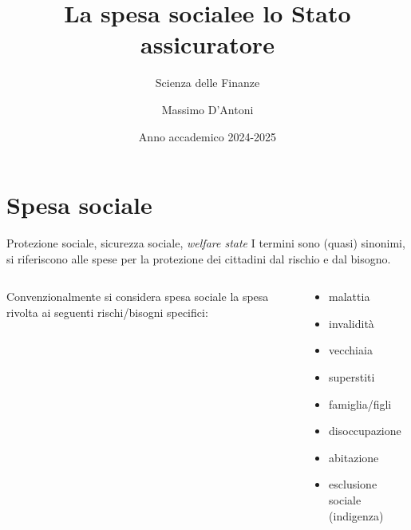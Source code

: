 \documentclass[aspectratio=64,12pt]{beamer}
\institute{Università di Siena}
\author{Massimo D'Antoni}
\date{Anno accademico 2024-2025}
\title{La spesa sociale\newline e lo Stato assicuratore}
\subtitle{Scienza delle Finanze}
\begin{document}
\maketitle

\section{Spesa sociale}

\begin{frame}{Protezione sociale, sicurezza sociale, \emph{welfare state}}
I termini sono (quasi) sinonimi, si riferiscono alle spese per la protezione
dei cittadini dal rischio e dal bisogno.
\medskip

\begin{columns}
\begin{column}[c]{0.4\columnwidth}
 Convenzionalmente si considera spesa sociale la spesa rivolta ai seguenti rischi/bisogni specifici:
\end{column}

\begin{column}[c]{.58\columnwidth}
\begin{itemize}
\item malattia
\item invalidità
\item vecchiaia
\item superstiti
\item famiglia/figli
\item disoccupazione
\item abitazione
\item esclusione sociale (indigenza)
\end{itemize}
\end{column}
\end{columns}
\end{frame}
\end{document}
